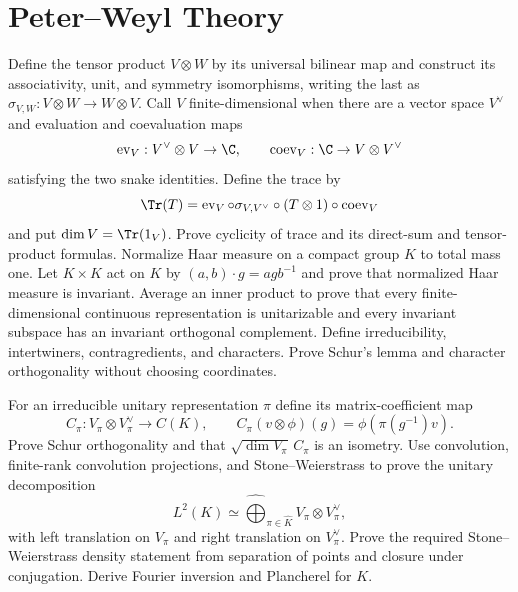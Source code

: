 \section{Peter--Weyl Theory}

\begin{exercise}
Define the tensor product $V\otimes W$ by its universal bilinear map and
construct its associativity, unit, and symmetry isomorphisms, writing the
last as $\sigma_{V,W}:V\otimes W\to W\otimes V$.  Call $V$ finite-dimensional
when there are a vector space $V^\vee$ and evaluation
and coevaluation maps
\[
 \operatorname{ev}_V:V^\vee\otimes V\to\C,
 \qquad \operatorname{coev}_V:\C\to V\otimes V^\vee
\]
satisfying the two snake identities.  Define the trace by
\[
\Tr(T)=\operatorname{ev}_V\circ\sigma_{V,V^\vee}\circ
 (T\otimes1)\circ\operatorname{coev}_V
\]
and put $\dim V=\Tr(1_V)$.  Prove cyclicity of trace and its direct-sum and
tensor-product formulas.
Normalize Haar measure on a compact group $K$ to total mass one.  Let
$K\times K$ act on $K$ by
$(a,b)\mathbin\cdot g=agb^{-1}$ and prove that normalized Haar measure is
invariant.  Average an
inner product to prove that every finite-dimensional continuous
representation is unitarizable and every invariant subspace has an invariant
orthogonal complement.  Define irreducibility, intertwiners, contragredients,
and characters.  Prove Schur's lemma and character orthogonality without
choosing coordinates.
\end{exercise}

\begin{exercise}
For an irreducible unitary representation $\pi$ define its matrix-coefficient
map
\[
 C_\pi:V_\pi\otimes V_\pi^\vee\longrightarrow C(K),
 \qquad C_\pi(v\otimes\phi)(g)=\phi(\pi(g^{-1})v).
\]
Prove Schur orthogonality and that $\sqrt{\dim V_\pi}\,C_\pi$ is an isometry.
Use convolution, finite-rank convolution projections, and Stone--Weierstrass to
prove the unitary decomposition
\[
 L^2(K)\simeq\widehat\bigoplus_{\pi\in\widehat K}
 V_\pi\otimes V_\pi^\vee,
\]
with left translation on $V_\pi$ and right translation on $V_\pi^\vee$.
Prove the required Stone--Weierstrass density statement from separation of
points and closure under conjugation.  Derive Fourier inversion and
Plancherel for $K$.
\end{exercise}

